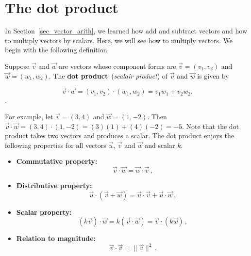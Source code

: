 \fi
\fi


\section{The dot product}
\label{sec_scalair_product}
In Section~\ref{sec_vector_arith}, we learned how add and subtract vectors and how to multiply vectors by scalars.  Here, we will see how to multiply vectors.  We begin with the following definition.


\begin{definition} \label{dotproductdefn}    
Suppose $\vec{v}$ and $\vec{w}$ are vectors whose component forms are $\vec{v} = \left(v_1,v_2\right)$ and $\vec{w} = \left(w_1,w_2\right)$.  The \textbf{dot product}\ (\textit{scalair product})  of $\vec{v}$ and $\vec{w}$ is given by

\[ \vec{v} \cdot \vec{w} = \left(v_1,v_2\right) \cdot \left(w_1,w_2\right) = v_1w_1 + v_2w_2. \].

\end{definition}


For example, let $\vec{v} = \left(3,4\right)$ and $\vec{w} = \left(1,-2\right)$.  Then $\vec{v} \cdot \vec{w} = \left(3,4\right) \cdot \left(1,-2\right) =  (3)(1) + (4)(-2) = -5$. Note that the dot product takes two vectors and produces a scalar. The dot product enjoys the following properties for all vectors $\vec{u}$, $\vec{v}$ and $\vec{w}$ and scalar $k$.

\begin{itemize}

\item  \textbf{Commutative property:}  
 $$\vec{v} \cdot \vec{w} = \vec{w} \cdot \vec{v}\,,$$

\item  \textbf{Distributive property:}  
 $$\vec{u} \cdot \left(\vec{v} + \vec{w}\right) = \vec{u} \cdot \vec{v} + \vec{u} \cdot \vec{w}\,,$$

\item  \textbf{Scalar property:}  
 $$ (k \vec{v}) \cdot \vec{w} = k(\vec{v} \cdot \vec{w}) = \vec{v} \cdot (k \vec{w})\,,$$

\item  \textbf{Relation to magnitude:}  
 $$\vec{v} \cdot \vec{v} = \| \vec{v} \|^2\,.$$ 

\end{itemize}


